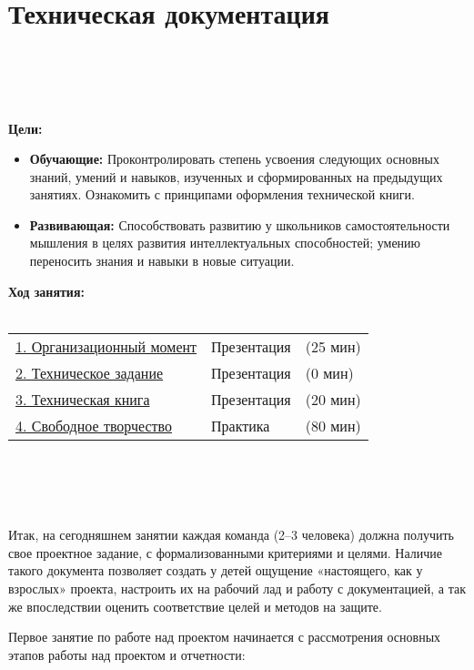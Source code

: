 \chapter{Техническая документация}
{\bfseries{}}\\\\
~\\\\
{\bfseries Цели:}
\begin{itemize}
	\item{}{\bfseries Обучающие:} Проконтролировать степень усвоения следующих основных знаний, умений и навыков, изученных и сформированных на предыдущих занятиях. Ознакомить с принципами оформления технической книги. 
	\item{}{\bfseries Развивающая:} Способствовать развитию  у школьников самостоятельности мышления в целях развития интеллектуальных способностей; умению переносить знания и навыки в новые ситуации.\\
\end{itemize}	
{\bfseries Ход занятия:}\\\\
\begin{tabular}[h!]{lll}
	{\hyperlink{lesson23x1}{1. Организационный момент}}&{Презентация}&{(25 мин)}\\
	{\hyperlink{lesson23x2}{2. Техническое задание}}&{Презентация}&{(0 мин)}\\
	{\hyperlink{lesson23x3}{3. Техническая книга}}&{Презентация}&{(20 мин)}\\
	{\hyperlink{lesson23x4}{4. Свободное творчество}}&{Практика}&{(80 мин)}\\
\end{tabular}\\\\

{\hypertarget{lesson23x1}{}}\\\\

Итак, на сегодняшнем занятии каждая команда (2--3 человека) должна получить свое проектное задание, с формализованными критериями и целями. Наличие такого документа позволяет создать у детей ощущение «настоящего, как у взрослых» проекта, настроить их на рабочий лад  и работу с документацией, а так же впоследствии оценить соответствие целей и методов на защите.

Первое занятие по работе над проектом начинается с рассмотрения основных этапов работы над проектом и отчетности:

